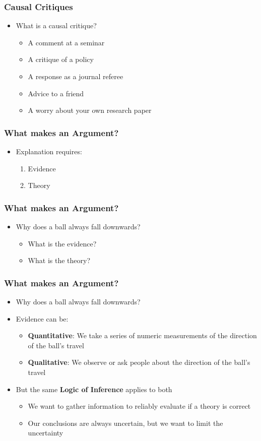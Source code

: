 \documentclass[xcolor=x11names,compress]{beamer}\usepackage[]{graphicx}\usepackage[]{color}
\renewcommand{\(}{\begin{columns}}
\renewcommand{\)}{\end{columns}}
\newcommand{\<}[1]{\begin{column}{#1}}
\renewcommand{\>}{\end{column}}
\begin{document}
\begin{frame}
\frametitle{Causal Critiques}
\begin{itemize}
\item What is a causal critique?
\begin{itemize}
\item A comment at a seminar
\item A critique of a policy
\item A response as a journal referee
\item Advice to a friend
\item A worry about your own research paper
\end{itemize}
\end{itemize}
\end{frame}

\begin{frame}
\frametitle{What makes an Argument?}
\begin{itemize}
\item  Explanation requires:
\begin{enumerate}
\item  Evidence
\item  Theory
\end{enumerate}
\end{itemize}
\begin{frame}

\begin{frame}
\frametitle{What makes an Argument?}
\begin{itemize}
\item Why does a ball always fall downwards?
\begin{itemize}
\item What is the evidence?
\pause
\item What is the theory?
\end{itemize}
\end{itemize}
\end{frame}

\begin{frame}
\frametitle{What makes an Argument?}
\begin{itemize}
\item Why does a ball always fall downwards?
\item Evidence can be:
\begin{itemize}
\item \textbf{Quantitative}: We take a series of numeric measurements of the direction of the ball's travel
\item \textbf{Qualitative}: We observe or ask people about the direction of the ball's travel
\end{itemize}
\item But the same \textbf{Logic of Inference} applies to both
\begin{itemize}
\item We want to gather information to reliably evaluate if a theory is correct
\item Our conclusions are always uncertain, but we want to limit the uncertainty
\end{itemize}
\end{itemize}
\end{frame}


\end{frame}
\end{frame}
\end{document}
